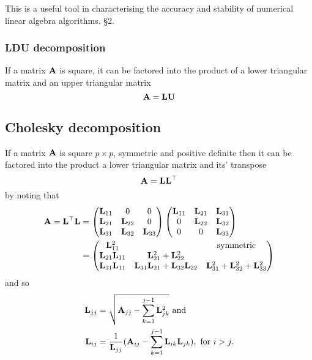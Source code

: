 \documentclass{amsart}[12pt]
\begin{document}
This is a useful tool in characterising the accuracy and stability of numerical linear algebra algorithms.
\cite{Golub:1996:MC:248979} \S 2.

\subsubsection{LDU decomposition}

If a matrix ${\bf A}$ is square, it can be factored into the product of a lower triangular matrix and an upper 
triangular matrix
\[
	{\bf A} = {\bf L} {\bf U}
\]

\subsection{Cholesky decomposition}

If a matrix ${\bf A}$ is square $p \times p$, symmetric and positive definite then it can be factored into the
product a lower triangular matrix and its' transpose
\[
	{\bf A} = {\bf L} {\bf L}^\top
\]
by noting that
\begin{align*}
	{\bf A} = {\bf L}^\top {\bf L} &= \begin{pmatrix}
	{\bf L}_{11}          & 0                                     & 0                                    \\
	{\bf L}_{21}          & {\bf L}_{22}                              & 0                                    \\
	{\bf L}_{31}          & {\bf L}_{32}                              & {\bf L}_{33}                             
	\end{pmatrix}
	\begin{pmatrix}
	{\bf L}_{11}          & {\bf L}_{21}                              & {\bf L}_{31}                             \\
	0                 & {\bf L}_{22}                              & {\bf L}_{32}                             \\
	0                 & 0                                     & {\bf L}_{33}                             
	\end{pmatrix}	\\
	&= \begin{pmatrix}
	{\bf L}_{11}^2        &                                       & \text{symmetric}                     \\
	{\bf L}_{21} {\bf L}_{11} & {\bf L}_{21}^2 + {\bf L}_{22}^2               &                                      \\
	{\bf L}_{31} {\bf L}_{11} & {\bf L}_{31} {\bf L}_{21} + {\bf L}_{32} {\bf L}_{22} & {\bf L}_{31}^2 + {\bf L}_{32}^2 + {\bf L}_{33}^2 
	\end{pmatrix}
\end{align*}
and so
\begin{align*}
	{\bf L}_{jj} & = \sqrt{{\bf A}_{jj} - \sum_{k=1}^{j-1} {\bf L}_{jk}^2} \text{ and}                               \\
	{\bf L}_{ij} & = \frac{1}{{\bf L}_{jj}} ({\bf A}_{ij} - \sum_{k=1}^{j-1} {\bf L}_{ik} {\bf L}_{jk}), \text{ for } i > j. 
\end{align*}
\end{document}
